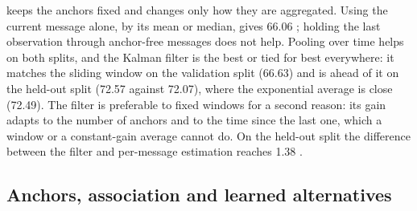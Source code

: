  keeps the anchors fixed and changes only how they are aggregated.
Using the current message alone, by its mean or median, gives 66.06 \apseven; holding the last observation through anchor-free messages does not help.
Pooling over time helps on both splits, and the Kalman filter is the best or tied for best everywhere: it matches the sliding window on the validation split (66.63) and is ahead of it on the held-out split (72.57 against 72.07), where the exponential average is close (72.49).
The filter is preferable to fixed windows for a second reason: its gain adapts to the number of anchors and to the time since the last one, which a window or a constant-gain average cannot do.
On the held-out split the difference between the filter and per-message estimation reaches 1.38 \apseven.

\subsection{Anchors, association and learned alternatives}
\label{sec:ablation}

\begin{table}[t]
  \centering
  \caption{\textbf{Association and anchor choices.} \apseven (\%) averaged over the five detectors, three heads and four budgets. All variants share one fixed setting of $q$ and $\tau_p$ per detector, which precedes the final per-detector selection, so absolute values differ from \cref{tab:main}; the calibration column is the selection criterion. Confident ego anchors: ego detections with score $\ge\tau_p$. Prediction-gated: remote boxes are shifted by the current estimate before matching.}
  \label{tab:ablation}
  \small
  \setlength{\tabcolsep}{4pt}
\end{table}


